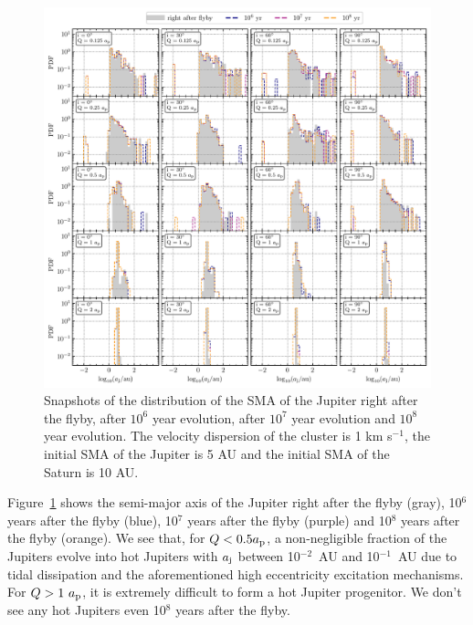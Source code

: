\documentclass[twocolumn]{aastex63}
\newcommand*\fgr[1]{Figure~\ref{#1}}
\begin{document}
\begin{figure}
    \includegraphics[width=\textwidth]{figs/HJ_aj-r2.pdf}
    \caption{Snapshots of the distribution of the SMA of the Jupiter right after the flyby, after $10^6$ year evolution, after $10^7$ year evolution and $10^8$ year evolution. The velocity dispersion of the cluster is 1 km s$^{-1}$, the initial SMA of the Jupiter is 5 AU and the initial SMA of the Saturn is 10 AU. }
    \label{fig:hj-aj-s1-r2}
\end{figure}
\fgr{fig:hj-aj-s1-r2} shows the semi-major axis of the Jupiter right after the flyby (gray), 10$^6$ years after the flyby (blue), 10$^7$ years after the flyby (purple) and 10$^8$ years after the flyby (orange). We see that, for $Q<0.5a_{\rm p}$,  a non-negligible fraction of the Jupiters evolve into hot Jupiters with $a_{\rm j}$ between 10$^{-2}$~AU and 10$^{-1}$~AU due to tidal dissipation and the aforementioned high eccentricity excitation mechanisms. For $Q>1~a_{\rm p}$, it is extremely difficult to form a hot Jupiter progenitor. We don't see any hot Jupiters even 10$^{8}$ years after the flyby. 
\end{document}
